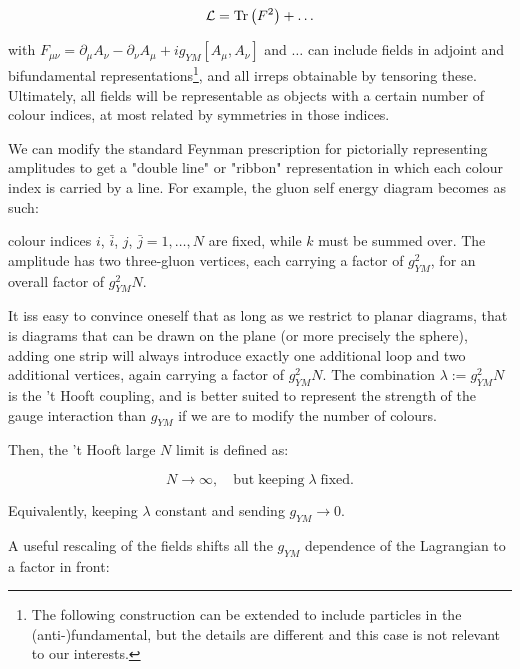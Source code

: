 \begin{equation}
\mathcal{L} = \operatorname{Tr} \left(F^2\right) + \ldots 
\end{equation}

with $F_{\mu\nu} = \partial_\mu A_\nu - \partial_\nu A_\mu + i g_{YM} [A_\mu,A_\nu]$ and $\ldots$ can include fields in adjoint and bifundamental representations\footnote{The following construction can be extended to include particles in the (anti-)fundamental, but the details are different and this case is not relevant to our interests.}, and all irreps obtainable by tensoring these. Ultimately, all fields will be representable as objects with a certain number of colour indices, at most related by symmetries in those indices.

We can modify the standard Feynman prescription for pictorially representing amplitudes to get a "double line" or "ribbon" representation in which each colour index is carried by a line. For example, the gluon self energy diagram becomes as such:

\begin{center}
\def\svgwidth{200pt}

\end{center}

colour indices $i$, $\bar i$, $j$, $\bar j = 1 , \ldots , N$ are fixed, while $k$ must be summed over. The amplitude has two three-gluon vertices, each carrying a factor of $g_{YM}^2$, for an overall factor of $g_{YM}^2 N$.

It iss easy to convince oneself that as long as we restrict to planar diagrams, that is diagrams that can be drawn on the plane (or more precisely the sphere), adding one strip will always introduce exactly one additional loop and two additional vertices, again carrying a factor of $g_{YM}^2 N$. The combination $\lambda := g_{YM}^2 N$ is the 't Hooft coupling, and is better suited to represent the strength of the gauge interaction than $g_{YM}$ if we are to modify the number of colours.

Then, the 't Hooft large $N$ limit is defined as:

\begin{equation}
N \rightarrow \infty, \quad \mathrm{but \; keeping } \; \lambda \; \mathrm{fixed.}
\end{equation}

Equivalently, keeping $\lambda$ constant and sending $g_{YM} \rightarrow 0$.

A useful rescaling of the fields shifts all the $g_{YM}$ dependence of the Lagrangian to a factor in front:

